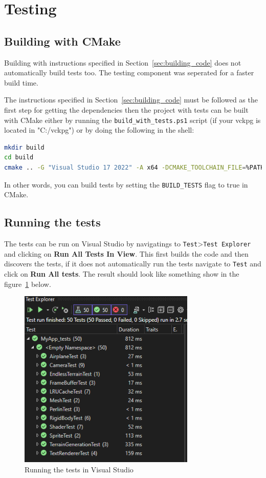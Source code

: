 \section{Testing}

\subsection{Building with CMake}
Building with instructions specified in Section~\ref{sec:building_code} does not automatically build tests too. The testing component was seperated for a faster build time.


The instructions specified in Section~\ref{sec:building_code} must be followed as the first step for getting the dependencies then the project with tests can be built with CMake either by running the \texttt{build\_with\_tests.ps1} script (if your vckpg is located in "C:/vckpg") or by doing the following in the shell:
\begin{lstlisting}[language=bash]
mkdir build
cd build
cmake .. -G "Visual Studio 17 2022" -A x64 -DCMAKE_TOOLCHAIN_FILE=%PATH_TO_VCPKG%/scripts/buildsystems/vcpkg.cmake -DBUILD_TESTS=TRUE
\end{lstlisting}

In other words, you can build tests by setting the \texttt{BUILD\_TESTS} flag to true in CMake.

\subsection{Running the tests}
The tests can be run on Visual Studio by navigatings to \texttt{Test}>\texttt{Test Explorer} and clicking on \textbf{Run All Tests In View}. This first builds the code and then discovers the tests, if it does not automatically run the tests navigate to \texttt{Test} and click on \textbf{Run All tests}. The result should look like something show in the figure~\ref{fig:test_results} below.

\begin{figure}[H]
    \centering
    \includegraphics[width=0.75\textwidth]{images/test_results.png}
    \caption{Running the tests in Visual Studio}
    \label{fig:test_results}
\end{figure}

